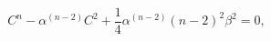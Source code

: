 \begin{equation}
C^{n}-\alpha^{(n-2)}C^{2}+\frac{1}{4}\alpha^{(n-2)}(n-2)^{2}\beta^{2}=0
\label{eqC},
\end{equation}

